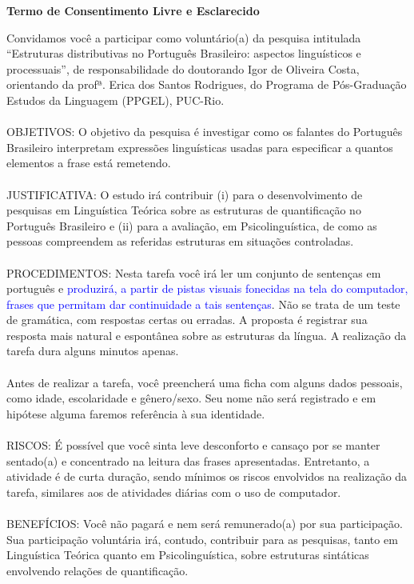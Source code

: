 \begin{center}
  \textbf{Termo de Consentimento Livre e Esclarecido}
\end{center}
Convidamos você a participar como voluntário(a) da pesquisa intitulada ``Estruturas distributivas no Português Brasileiro: aspectos linguísticos e processuais'', de responsabilidade do doutorando Igor de Oliveira Costa, orientando da profª. Erica dos Santos Rodrigues, do Programa de Pós-Graduação Estudos da Linguagem (PPGEL), PUC-Rio.
\\
\\
OBJETIVOS: O objetivo da pesquisa é investigar como os falantes do Português Brasileiro interpretam expressões linguísticas usadas para especificar a quantos elementos a frase está remetendo.
\\
\\
JUSTIFICATIVA: O estudo irá contribuir (i) para o desenvolvimento de pesquisas em Linguística Teórica sobre as estruturas de quantificação no Português Brasileiro e (ii) para a avaliação, em Psicolinguística, de como as pessoas compreendem as referidas estruturas em situações controladas.
\\
\\
PROCEDIMENTOS: Nesta tarefa você irá ler um conjunto de sentenças em português e \textcolor{blue}{produzirá, a partir de pistas visuais fonecidas na tela do computador, frases que permitam dar continuidade a tais sentenças}. Não se trata de um teste de gramática, com respostas certas ou erradas. A proposta é registrar sua resposta mais natural e espontânea sobre as estruturas da língua. A realização da tarefa dura alguns minutos apenas.
\\
\\
Antes de realizar a tarefa, você preencherá uma ficha com alguns dados pessoais, como idade, escolaridade e gênero/sexo. Seu nome não será registrado e em hipótese alguma faremos referência à sua identidade.
\\
\\
RISCOS: É possível que você sinta leve desconforto e cansaço por se manter sentado(a) e concentrado na leitura das frases apresentadas. Entretanto, a atividade é de curta duração, sendo mínimos os riscos envolvidos na realização da tarefa, similares aos de atividades diárias com o uso de computador.
\\
\\
BENEFÍCIOS: Você não pagará e nem será remunerado(a) por sua participação. Sua participação voluntária irá, contudo, contribuir para as pesquisas, tanto em Linguística Teórica quanto em Psicolinguística, sobre estruturas sintáticas envolvendo relações de quantificação.
